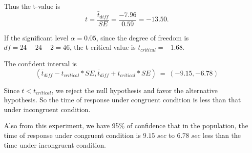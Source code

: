 \documentclass[paper=a4, fontsize=11pt]{scrartcl} %
\numberwithin{equation}{section} %
\numberwithin{figure}{section} %
\numberwithin{table}{section} %
\begin{document}
Thus the t-value is
\begin{equation}
    t = \frac{\bar{t}_{diff}}{SE} = \frac{-7.96}{0.59} = -13.50.
\end{equation}

If the significant level $\alpha = 0.05$, since the degree of
freedom is $df = 24 + 24 - 2 = 46$, the t critical value is
$t_{critical} = -1.68$.

The confident interval is 
\begin{equation}
    (\bar{t}_{diff} - t_{critical} * SE,
    \bar{t}_{diff} + t_{critical} * SE)
    \ = \ (-9.15, -6.78)
\end{equation}

Since $t < t_{critical}$, we reject the null hypothesis and
favor the alternative hypothesis.
So the time of response under congruent condition is less than
that under incongruent condition.

Also from this experiment, we have 95\% of confidence that in the
population, the time of response under congruent condition is
$9.15 \; sec$ to $6.78 \; sec$ less than the time under incongruent condition.
\end{document}
